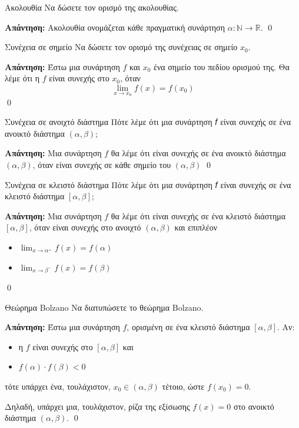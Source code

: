 \documentclass[a4paper, 12pt]{article}
\renewenvironment{proof}[1][\textbf{Απάντηση}]{%
  \par\noindent\textbf{#1:} \rmfamily}{\qed\par}
\begin{document}
\begin{theorem}{Ακολουθία}
  Να δώσετε τον ορισμό της ακολουθίας.
\end{theorem}
\begin{proof}
  Ακολουθία ονομάζεται κάθε πραγματική συνάρτηση $α : \mathbb{N} \to \mathbb{R}$.
\end{proof}

\begin{theorem}{Συνέχεια σε σημείο}
  Να δώσετε τον ορισμό της συνέχειας σε σημείο $x_0$.
\end{theorem}
\begin{proof}
  Έστω μια συνάρτηση $f$ και $x_0$ ένα σημείο του πεδίου ορισμού της. Θα λέμε ότι η $f$ είναι συνεχής στο $x_0$, όταν
  $$\lim_{x \to x_0} f(x) = f(x_0)$$
\end{proof}

\begin{theorem}{Συνέχεια σε ανοιχτό διάστημα}
  Πότε λέμε ότι μια συνάρτηση 𝑓 είναι συνεχής σε ένα ανοικτό διάστημα  $(α, β)$;
\end{theorem}
\begin{proof}
  Μια συνάρτηση $f$ θα λέμε ότι είναι συνεχής σε ένα ανοικτό διάστημα $(α, β)$, όταν είναι συνεχής σε κάθε σημείο του $(α, β)$
\end{proof}

\begin{theorem}{Συνέχεια σε κλειστό διάστημα}
  Πότε λέμε ότι μια συνάρτηση 𝑓 είναι συνεχής σε ένα κλειστό διάστημα  $[α, β]$;
\end{theorem}
\begin{proof}
  Μια συνάρτηση $f$ θα λέμε ότι είναι συνεχής σε ένα κλειστό διάστημα $[α, β]$, όταν είναι συνεχής στο ανοιχτό $(α, β)$ και επιπλέον
  \begin{itemize}
    \item $\lim_{x \to α^+} f(x) = f(α)$
    \item $\lim_{x \to β^-} f(x) = f(β)$
  \end{itemize}
\end{proof}

\begin{theorem}{Θεώρημα Bolzano}
  Να διατυπώσετε το θεώρημα Bolzano.
\end{theorem}
\begin{proof}
  Έστω μια συνάρτηση $f$, ορισμένη σε ένα κλειστό διάστημα $[α, β]$. Αν:
  \begin{itemize}
    \item η $f$ είναι συνεχής στο $[α, β]$ και
    \item $f(α)\cdot f(β) < 0$
  \end{itemize}
  τότε υπάρχει ένα, τουλάχιστον, $x_0 \in (α,β )$ τέτοιο, ώστε
  $f(x_0) = 0$.

  Δηλαδή, υπάρχει μια, τουλάχιστον, ρίζα της εξίσωσης $f(x) = 0$ στο ανοικτό διάστημα $(α, β)$.
\end{proof}
\end{document}
